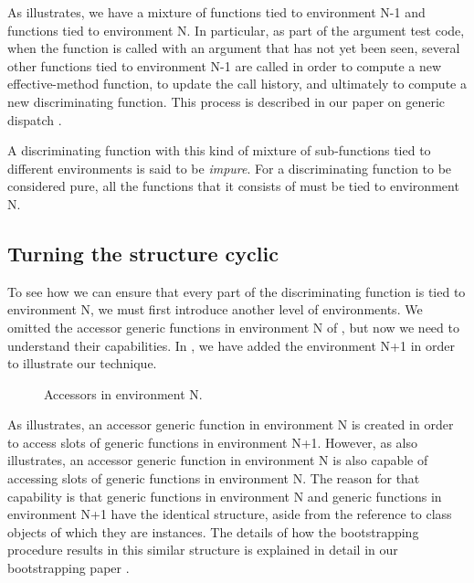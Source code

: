 As  illustrates, we have a
mixture of functions tied to environment N-1 and functions tied to
environment N.  In particular, as part of the argument test code, when
the function is called with an argument that has not yet been seen,
several other functions tied to environment N-1 are called in order to
compute a new effective-method function, to update the call history,
and ultimately to compute a new discriminating function.  This process
is described in our paper on generic dispatch
\cite{Strandh:2014:FGD:2635648.2635654}.

A discriminating function with this kind of mixture of sub-functions
tied to different environments is said to be \emph{impure}.  For a
discriminating function to be considered pure, all the functions that
it consists of must be tied to environment N.

\subsection{Turning the structure cyclic}

To see how we can ensure that every part of the discriminating
function is tied to environment N, we must first introduce another
level of environments.  We omitted the accessor generic functions in
environment N of , but now we need to
understand their capabilities.  In , we
have added the environment N+1 in order to illustrate our technique.

\begin{figure}
\begin{center}
\end{center}
\caption{\label{fig-constellation-2}
Accessors in environment N.}
\end{figure}

As  illustrates, an accessor generic
function in environment N is created in order to access slots of
generic functions in environment N+1.  However, as
 also illustrates, an accessor generic
function in environment N is also capable of accessing slots of
generic functions in environment N.  The reason for that capability is
that generic functions in environment N and generic functions in
environment N+1 have the identical structure, aside from the reference
to class objects of which they are instances.  The details of how the
bootstrapping procedure results in this similar structure is explained
in detail in our bootstrapping paper
\cite{Durand-Strandh:2019:ELS:Bootstrapping}.

